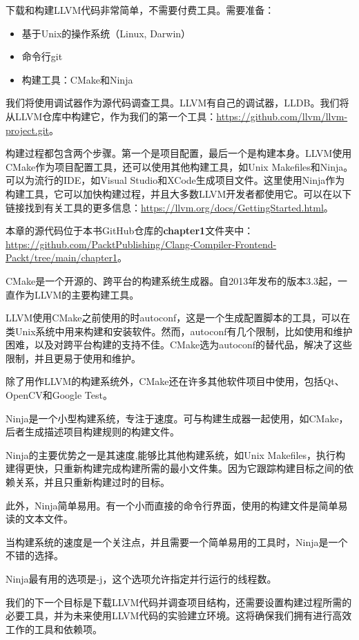 下载和构建LLVM代码非常简单，不需要付费工具。需要准备：

\begin{itemize}
\item
基于Unix的操作系统（Linux, Darwin）

\item
命令行git

\item
构建工具：CMake和Ninja
\end{itemize}

我们将使用调试器作为源代码调查工具。LLVM有自己的调试器，LLDB。我们将从LLVM仓库中构建它，作为我们的第一个工具：\url{https://github.com/llvm/llvm-project.git}。

构建过程都包含两个步骤。第一个是项目配置，最后一个是构建本身。LLVM使用CMake作为项目配置工具，还可以使用其他构建工具，如Unix Makefiles和Ninja。可以为流行的IDE，如Visual Studio和XCode生成项目文件。这里使用Ninja作为构建工具，它可以加快构建过程，并且大多数LLVM开发者都使用它。可以在以下链接找到有关工具的更多信息：\url{https://llvm.org/docs/GettingStarted.html}。

本章的源代码位于本书GitHub仓库的\textbf{chapter1}文件夹中：\url{https://github.com/PacktPublishing/Clang-Compiler-Frontend-Packt/tree/main/chapter1}。


CMake是一个开源的、跨平台的构建系统生成器。自2013年发布的版本3.3起，一直作为LLVM的主要构建工具。

LLVM使用CMake之前使用的时autoconf，这是一个生成配置脚本的工具，可以在类Unix系统中用来构建和安装软件。然而，autoconf有几个限制，比如使用和维护困难，以及对跨平台构建的支持不佳。CMake选为autoconf的替代品，解决了这些限制，并且更易于使用和维护。

除了用作LLVM的构建系统外，CMake还在许多其他软件项目中使用，包括Qt、OpenCV和Google Test。


Ninja是一个小型构建系统，专注于速度。可与构建生成器一起使用，如CMake，后者生成描述项目构建规则的构建文件。

Ninja的主要优势之一是其速度,能够比其他构建系统，如Unix Makefiles，执行构建得更快，只重新构建完成构建所需的最小文件集。因为它跟踪构建目标之间的依赖关系，并且只重新构建过时的目标。

此外，Ninja简单易用。有一个小而直接的命令行界面，使用的构建文件是简单易读的文本文件。

当构建系统的速度是一个关注点，并且需要一个简单易用的工具时，Ninja是一个不错的选择。

Ninja最有用的选项是-j，这个选项允许指定并行运行的线程数。

我们的下一个目标是下载LLVM代码并调查项目结构，还需要设置构建过程所需的必要工具，并为未来使用LLVM代码的实验建立环境。这将确保我们拥有进行高效工作的工具和依赖项。






























